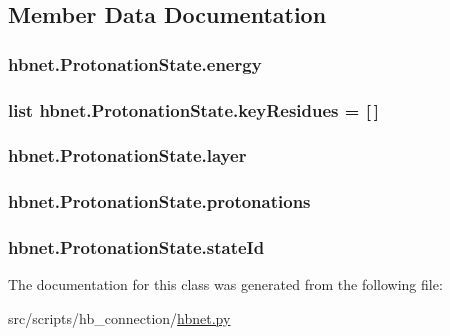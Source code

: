 \subsection{Member Data Documentation}
\hypertarget{classhbnet_1_1_protonation_state_afa6daa253fcebb9a9707a139e11da56d}{
\subsubsection[{energy}]{\setlength{\rightskip}{0pt plus 5cm}hbnet.\-Protonation\-State.\-energy}}\label{classhbnet_1_1_protonation_state_afa6daa253fcebb9a9707a139e11da56d}
\hypertarget{classhbnet_1_1_protonation_state_ab12d91a13b61409406e42e0bc32738d9}{
\subsubsection[{key\-Residues}]{\setlength{\rightskip}{0pt plus 5cm}list hbnet.\-Protonation\-State.\-key\-Residues = \mbox{[}$\,$\mbox{]}\hspace{0.3cm}{\ttfamily [static]}}}\label{classhbnet_1_1_protonation_state_ab12d91a13b61409406e42e0bc32738d9}
\hypertarget{classhbnet_1_1_protonation_state_a1090fe1738d0d790e2e1dbf75d60249b}{
\subsubsection[{layer}]{\setlength{\rightskip}{0pt plus 5cm}hbnet.\-Protonation\-State.\-layer}}\label{classhbnet_1_1_protonation_state_a1090fe1738d0d790e2e1dbf75d60249b}
\hypertarget{classhbnet_1_1_protonation_state_af3ba85dacb1001aaa694dd539eabfecc}{
\subsubsection[{protonations}]{\setlength{\rightskip}{0pt plus 5cm}hbnet.\-Protonation\-State.\-protonations}}\label{classhbnet_1_1_protonation_state_af3ba85dacb1001aaa694dd539eabfecc}
\hypertarget{classhbnet_1_1_protonation_state_ad5303a482661dbcf70bce07ff287079b}{
\subsubsection[{state\-Id}]{\setlength{\rightskip}{0pt plus 5cm}hbnet.\-Protonation\-State.\-state\-Id}}\label{classhbnet_1_1_protonation_state_ad5303a482661dbcf70bce07ff287079b}


The documentation for this class was generated from the following file\-:\begin{DoxyCompactItemize}
\item 
src/scripts/hb\-\_\-connection/\hyperlink{hbnet_8py}{hbnet.\-py}\end{DoxyCompactItemize}
